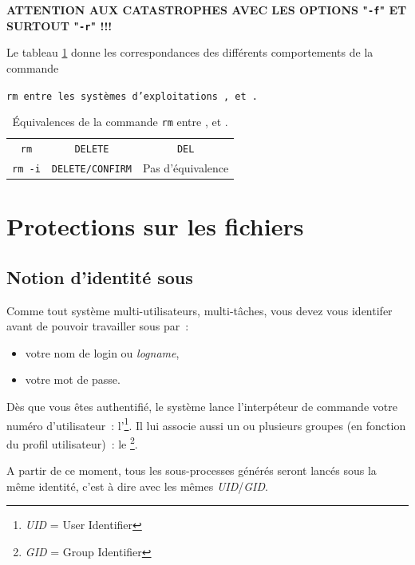 \begin{center}
{\large
	{\bf 
		ATTENTION AUX CATASTROPHES AVEC LES 
		OPTIONS "{\tt -f}" ET SURTOUT "{\tt -r}" !!!
	}
}
\end{center}

Le tableau \ref{tab-cmds-equiv-rm} donne les correspondances des
diff{\'e}rents comportements de la commande {\tt rm entre les syst{\`e}mes
d'exploitations {\Unix}, {\OpenVMS} et {\DOS}.

\begin{table}[hbtp]
\centering
\begin{tabular}{|c|c|c|} 
	\hline
		{\Unix}			&	{\OpenVMS}		&	{\DOS}					\\
	\hline \hline
		{\tt rm}		&	{\tt DELETE}	&	{\tt DEL}				\\
		{\tt rm -i}		&	{\tt DELETE/CONFIRM}
											&	Pas d'{\'e}quivalence	\\
	\hline
\end{tabular}
\caption{\label{tab-cmds-equiv-rm}\'{E}quivalences de la commande
{\tt rm} entre {\Unix},{\OpenVMS} et {\DOS}.}
\end{table}

\section{\label{cmds-protect}Protections sur les fichiers}

\subsection{\label{cmds-unix-id}Notion d'identit{\'e} sous {\Unix}}

Comme tout syst{\`e}me multi-utilisateurs, multi-t{\^a}ches, vous devez vous
identifer avant de pouvoir travailler sous {\Unix} par~:
\begin{itemize}
	\item	votre nom de login ou {\sl logname},
	\item	votre mot de passe.
\end{itemize}

D{\`e}s que vous {\^e}tes authentifi{\'e}, le syst{\`e}me lance
l'interp{\'e}teur de commande votre num{\'e}ro d'utilisateur~:
l'\footnote{{\sl UID} = User Identifier}. Il lui
associe aussi un ou plusieurs groupes (en fonction du profil
utilisateur)~: le \footnote{{\sl GID} = Group Identifier}.

A partir de ce moment, tous les sous-processes g{\'e}n{\'e}r{\'e}s seront lanc{\'e}s
sous la m{\^e}me identit{\'e}, c'est {\`a} dire avec les m{\^e}mes {\sl UID}/{\sl GID}.

}
